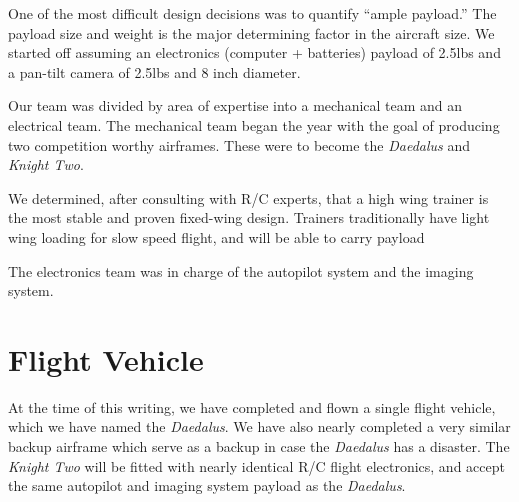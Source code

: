\documentclass[10pt]{report}
\begin{document}
One of the most difficult design decisions was to quantify ``ample payload.'' The payload size and weight is the major determining factor in the aircraft size.
We started off assuming an electronics (computer + batteries) payload of 2.5lbs and a pan-tilt camera of 2.5lbs and 8 inch diameter.


Our team was divided by area of expertise into a mechanical team and an electrical team.
The mechanical team began the year with the goal of producing two competition worthy airframes. These were to become the \emph{Daedalus} and \emph{Knight Two}.

We determined, after consulting with R/C experts, that a high wing trainer is the most stable and proven fixed-wing design. Trainers traditionally have light wing loading for slow speed flight, and will be able to carry payload 



The electronics team was in charge of the autopilot system and the imaging system. 

\section{Flight Vehicle}

At the time of this writing, we have completed and flown a single flight vehicle, which we have named the \emph{Daedalus}.
We have also nearly completed a very similar backup airframe which serve as a backup in case the \emph{Daedalus} has a disaster. The \emph{Knight Two} will be fitted with nearly identical R/C flight electronics, and accept the same autopilot and imaging system payload as the \emph{Daedalus}.
\end{document}
